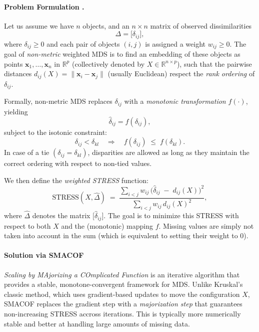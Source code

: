 \paragraph{Problem Formulation .} Let us assume we have $n$ objects, and an $n\times n$ matrix of observed dissimilarities 
\[
\Delta = \bigl[\delta_{ij}\bigr],
\]
where $\delta_{ij} \ge 0$ and each pair of objects $(i,j)$ is assigned a weight $w_{ij}\ge 0$. The goal of \emph{non-metric} weighted MDS is to find an embedding of these objects as points $\mathbf{x}_1,\dots,\mathbf{x}_n$ in $\mathbb{R}^p$ (collectively denoted by $X \in \mathbb{R}^{n\times p}$), such that the pairwise distances $d_{ij}(X) = \|\mathbf{x}_i - \mathbf{x}_j\|$ (usually Euclidean) respect the \emph{rank ordering} of $\delta_{ij}$.

Formally, non-metric MDS replaces $\delta_{ij}$ with a \emph{monotonic transformation} $f(\cdot)$, yielding
\[
\hat{\delta}_{ij} = f(\delta_{ij}),
\]
subject to the isotonic constraint:
\[
\delta_{ij} < \delta_{kl} 
\quad \Longrightarrow \quad 
f(\delta_{ij}) \;\le\; f(\delta_{kl}).
\]
In case of a tie $(\delta_{ij} = \delta_{kl} )$, disparities are allowed as long as they maintain the correct ordering with respect to non-tied values.

We then define the \emph{weighted STRESS} function:
\begin{equation}
\mathrm{STRESS}(X,\hat{\Delta}) 
\;=\;
\frac{\sum_{i<j} w_{ij}\,\bigl(\hat{\delta}_{ij} \;-\; d_{ij}(X)\bigr)^2}{\sum_{i<j} w_{ij}\,d_{ij}(X)^2},
\label{eq:stress}
\end{equation}
where $\hat{\Delta}$ denotes the matrix $\bigl[\hat{\delta}_{ij}\bigr]$.  
The goal is to minimize this STRESS with respect to both $X$ and the (monotonic) mapping $f$. Missing values are simply not taken into account in the sum (which is equivalent to setting their weight to 0).

\paragraph{Solution via SMACOF}\label{sec:smacof-solution}
\emph{Scaling by MAjorizing a COmplicated Function} is an iterative algorithm that provides a stable, monotone-convergent framework for MDS. Unlike Kruskal's classic method, which uses gradient-based updates to move the configuration $X$, SMACOF replaces the gradient step with a \emph{majorization step} that guarantees non-increasing STRESS accross iterations. This is typically more numerically stable and better at handling large amounts of missing data.

